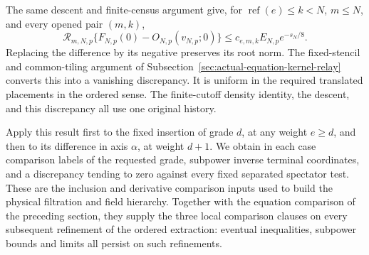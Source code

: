 The same descent and finite-census argument give, for
$\operatorname{ref}(e)\le k<N$, $m\le N$, and every opened pair $(m,k)$,
\[
 \mathcal R_{m,N,p}\{F_{N,p}(0)-O_{N,p}(v_{N,p};0)\}
                     \le c_{e,m,k}E_{N,p}e^{-s_N/8}.
\]
Replacing the difference by its negative preserves its root norm.
The fixed-stencil and common-tiling argument of
Subsection~\ref{sec:actual-equation-kernel-relay} converts this into a
vanishing discrepancy. It is uniform in the required translated
placements in the ordered sense. The finite-cutoff density identity,
the descent, and this discrepancy all use one original history.

Apply this result first to the fixed insertion of grade $d$, at any
weight $e\ge d$, and then to its difference in axis $\alpha$, at weight
$d+1$. We obtain in each case comparison labels of the requested grade,
subpower inverse terminal coordinates, and a discrepancy tending to
zero against every fixed separated spectator test. These are the
inclusion and derivative comparison inputs used to build the physical
filtration and field hierarchy. Together with the equation comparison
of the preceding section, they supply the three local comparison
clauses on every subsequent refinement of the ordered extraction:
eventual inequalities, subpower bounds and limits all persist on such
refinements.

